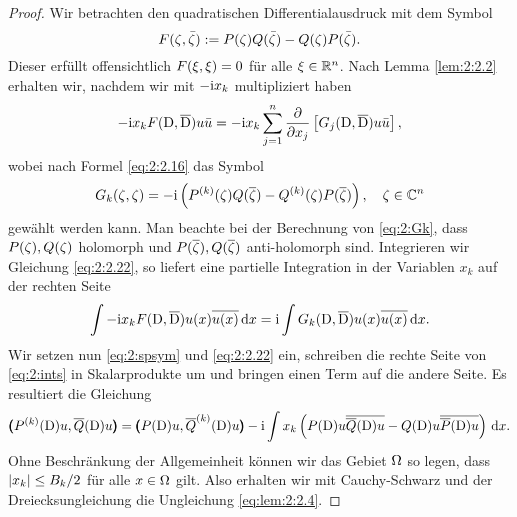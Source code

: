 \begin{proof}
Wir betrachten den quadratischen Differentialausdruck mit dem Symbol
\begin{equation}\label{eq:2:spsym}
F(\zeta,\bar{\zeta}):=P(\zeta)Q(\bar{\zeta})-Q(\zeta)P(\bar{\zeta}).
\end{equation}
Dieser erfüllt offensichtlich $F(\xi,\xi)=0$ für alle $\xi\in\mathbb R^n$.
Nach Lemma \ref{lem:2:2.2} erhalten wir,
nachdem wir mit $-\mathrm i x_k$ multipliziert haben
\begin{equation}\label{eq:2:2.22}
-\mathrm i x_kF(\mathrm D,\overline{\mathrm D})u\bar{u}=-\mathrm i x_k\sum_{j=1}^n\frac{\partial}{\partial x_j}\left[G_j(\mathrm D,\overline{\mathrm D})u\bar{u}\right],
\end{equation}
wobei nach Formel \eqref{eq:2:2.16} das Symbol
\begin{equation}
G_k(\zeta,\zeta)=-\mathrm i\left(P^{(k)}(\zeta)Q(\overline{\zeta})-Q^{(k)}(\zeta)P(\overline{\zeta})\right)\label{eq:2:Gk},
\quad\zeta\in\mathbb C^n
\end{equation}
gewählt werden kann.
Man beachte bei der Berechnung von \eqref{eq:2:Gk},
dass $P(\zeta),Q(\zeta)$ holomorph
und $P(\overline{\zeta}),Q(\overline{\zeta})$ anti-holomorph sind.
Integrieren wir Gleichung \eqref{eq:2:2.22},
so liefert eine partielle Integration
in der Variablen $x_k$ auf der rechten Seite
\begin{equation}\label{eq:2:ints}
\int-\mathrm i x_kF(\mathrm D,\overline{\mathrm D})u(x)\overline{u(x)}\,\mathrm d x=\mathrm i\int G_k(\mathrm D,\overline{\mathrm D})u(x)\overline{u(x)}\,\mathrm d x.
\end{equation}
Wir setzen nun \eqref{eq:2:spsym} und \eqref{eq:2:2.22} ein,
schreiben die rechte Seite von \eqref{eq:2:ints}
in Skalarprodukte um und bringen einen Term auf die andere Seite.
Es resultiert die Gleichung
\begin{equation}
\pmb(P^{(k)}(\mathrm D)u,\overline{Q}(\mathrm D)u\pmb)
=\pmb(P(\mathrm D)u,\overline{Q}^{(k)}(\mathrm D)u\pmb)-\mathrm i\int x_k\left(P(\mathrm D)u\overline{\overline{Q}(\mathrm D)u}-Q(\mathrm D)u\overline{\overline{P}(\mathrm D)u}\right)\,\mathrm d x.
\end{equation}
Ohne Beschränkung der Allgemeinheit können wir das Gebiet $\Omega$ so legen,
dass $\lvert x_k\rvert\leq B_k/2$ für alle $x\in\Omega$ gilt.
Also erhalten wir mit Cauchy-Schwarz
und der Dreiecksungleichung die Ungleichung \eqref{eq:lem:2:2.4}.
\end{proof}

